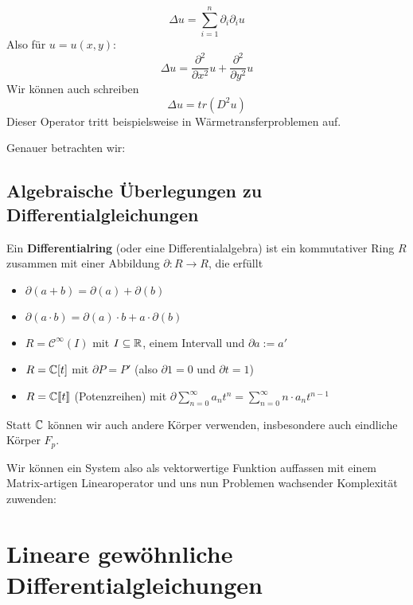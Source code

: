 \documentclass[main.tex]{subfiles}
\begin{document}
\begin{Beispiel}
  $$\Delta u = \sum \limits_{i = 1}^n \partial_i \partial_i u$$
  Also für $u = u(x,y)$:
  $$\Delta u = \dfrac{\partial^2}{\partial x^2}u + \dfrac{\partial^2}{\partial y^2} u$$
  Wir können auch schreiben
  $$\Delta u = tr(D^2 u)$$
  Dieser Operator tritt beispielsweise in Wärmetransferproblemen auf.
\end{Beispiel}

Genauer betrachten wir:

\subsection{Algebraische Überlegungen zu Differentialgleichungen}

\begin{Definition}[Differentialring]
  Ein \textbf{Differentialring} (oder eine Differentialalgebra) ist ein kommutativer Ring $R$ zusammen mit einer Abbildung $\partial: R \to R$, die erfüllt
  \begin{itemize}
    \item $\partial(a+b) = \partial(a) + \partial(b)$
    \item $\partial(a \cdot b) = \partial(a) \cdot b + a \cdot \partial(b)$
  \end{itemize}
\end{Definition}

\begin{Beispiel}
  \begin{itemize}
    \item $R = \mathcal{C}^\infty(I)$ mit $I \subseteq \mathbb{R}$, einem Intervall und $\partial a := a'$
    \item $R = \mathbb{C}[t]$ mit $\partial P = P'$ (also $\partial1 = 0$ und $\partial t = 1$)
    \item $R = \mathbb{C}[\![t]\!]$ (Potenzreihen) mit $\partial \sum \limits_{n=0}^\infty a_n t^n = \sum \limits_{n=0}^\infty n \cdot a_nt^{n-1}$
  \end{itemize}
  Statt $\mathbb{C}$ können wir auch andere Körper verwenden, insbesondere auch eindliche Körper $F_p$.
\end{Beispiel}

Wir können ein System also als vektorwertige Funktion auffassen mit einem Matrix-artigen Linearoperator und uns nun Problemen wachsender Komplexität zuwenden:


\section{Lineare gewöhnliche Differentialgleichungen}
\end{document}
